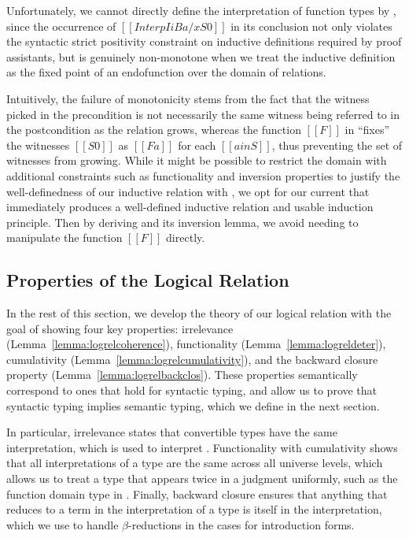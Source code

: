 \documentclass[\ifpublic nolinenum\else\fi,online,OA]{jfp}
\newcommand{\jc}[1]{}
\theoremstyle{definition}
\begin{document}
Unfortunately, we cannot directly define the interpretation of function types
by , since the occurrence of $[[Interp I i B {a/x} S0]]$ in its
conclusion not only violates the syntactic strict positivity constraint on
inductive definitions required by proof assistants,
but is genuinely non-monotone when we treat the inductive definition
as the fixed point of an endofunction over the domain of relations.
\jc{What?}
Intuitively, the failure of monotonicity stems from the fact that the witness
picked in the precondition is not necessarily the same witness being referred
to in the postcondition as the relation grows, \jc{Why?} whereas the function $[[F]]$
in  ``fixes'' the witnesses $[[S0]]$ as $[[F a]]$ for each
$[[a in S]]$, thus preventing the set of witnesses from growing. While it might
be possible to restrict the domain with additional constraints such as
functionality and inversion properties to justify the well-definedness of our
inductive relation with , we opt for our current
 that immediately produces a
well-defined inductive relation and usable induction principle.
Then by deriving  and its inversion lemma,
we avoid needing to manipulate the function $[[F]]$ directly.

\subsection{Properties of the Logical Relation}

In the rest of this section, we develop the theory of our logical relation
with the goal of showing four key properties: irrelevance
(Lemma~\ref{lemma:logrelcoherence}), functionality
(Lemma~\ref{lemma:logreldeter}), cumulativity
(Lemma~\ref{lemma:logrelcumulativity}), and the backward closure property
(Lemma~\ref{lemma:logrelbackclos}).
These properties semantically correspond to ones that hold for syntactic typing,
and allow us to prove that syntactic typing implies semantic typing, which we
define in the next section.

In particular, irrelevance states that convertible
types have the same interpretation, which is used to interpret .
Functionality with cumulativity shows that all interpretations of a type are
the same across all universe levels, which allows us to treat a type that
appears twice in a judgment uniformly, such as the function domain type in
. Finally, backward closure ensures that anything that reduces to
a term in the interpretation of a type is itself in the interpretation, which
we use to handle $\beta$-reductions in the cases for introduction forms.
\end{document}
